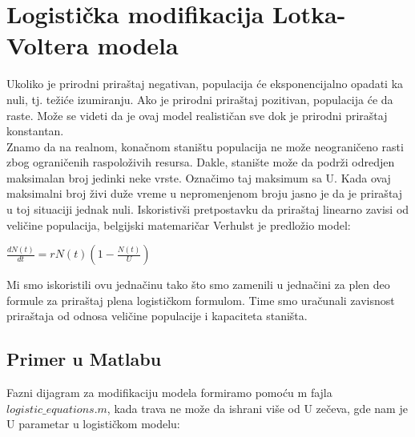 \documentclass[a4paper]{article}
\begin{document}
\section{Logistička modifikacija Lotka-Voltera modela}
\label{sec:log_mod}
Ukoliko je prirodni priraštaj negativan, populacija će eksponencijalno opadati ka nuli,
tj. težiće izumiranju. Ako je prirodni priraštaj pozitivan, populacija će da raste.
Može se videti da je ovaj model realističan sve dok je prirodni priraštaj konstantan.\\
Znamo da na realnom, konačnom staništu populacija ne može neograničeno rasti zbog
ograničenih raspoloživih resursa. Dakle, stanište može da podrži odredjen maksimalan broj
jedinki neke vrste. Označimo taj maksimum sa U. Kada ovaj maksimalni broj živi duže vreme u
nepromenjenom broju jasno je da je priraštaj u toj situaciji jednak nuli. Iskoristivši pretpostavku
da priraštaj linearno zavisi od veličine populacija, belgijski matemaričar Verhulst je predložio model:
	\begin{center}
		$\frac{dN(t)}{dt}=rN (t) (1 - \frac{N (t)}{U})$
	\end{center}
Mi smo iskoristili ovu jednačinu tako što smo zamenili u jednačini za plen deo
formule za priraštaj plena logističkom formulom. Time smo uračunali zavisnost
priraštaja od odnosa veličine populacije i kapaciteta staništa.\\

\subsection{Primer u Matlabu}
\label{sub:log_mod_matlab}

Fazni dijagram za modifikaciju modela formiramo pomoću m fajla $ logistic\_equations.m $, kada
trava ne može da ishrani više od U zečeva, gde nam je U parametar u logističkom modelu:


\end{document}
